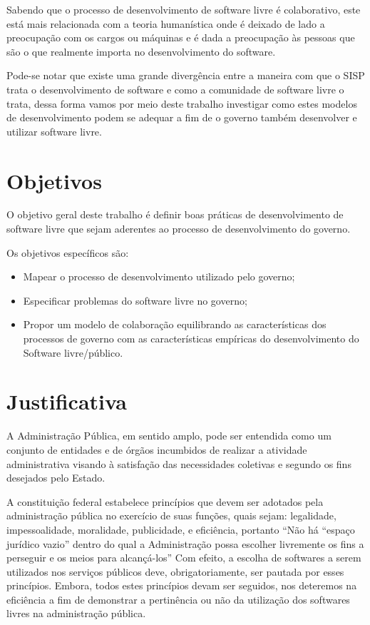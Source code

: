 Sabendo que o processo de desenvolvimento de software livre é colaborativo, este 
está mais relacionada com a teoria humanística onde é deixado de lado a preocupação
com os cargos ou máquinas e é dada a preocupação às pessoas que são o que realmente
importa no desenvolvimento do software.

Pode-se notar que existe uma grande divergência entre a maneira com que o SISP trata
o desenvolvimento de software e como a comunidade de software livre o trata, dessa forma vamos
por meio deste trabalho investigar como estes modelos de desenvolvimento podem 
se adequar a fim de o governo também desenvolver e utilizar software livre.

\section{Objetivos}

O objetivo geral deste trabalho é definir boas práticas de desenvolvimento de 
software livre que sejam aderentes ao processo de desenvolvimento do governo.

Os objetivos específicos são:

\begin{itemize}
\item Mapear o processo de desenvolvimento utilizado pelo governo;
\item Especificar problemas do software livre no governo;
\item Propor um modelo de colaboração equilibrando as características 
dos processos de governo com as características empíricas do desenvolvimento 
do Software livre/público.
\end{itemize}

\section{Justificativa}

A Administração Pública, em sentido amplo, pode ser entendida como um conjunto 
de entidades e de órgãos incumbidos de realizar a atividade administrativa visando 
à satisfação das necessidades coletivas e segundo os fins desejados pelo Estado.
\cite{coutinho2012uso}

A constituição federal estabelece princípios que devem ser adotados pela administração pública
no exercício de suas funções, quais sejam: legalidade, impessoalidade, moralidade, publicidade, e
eficiência, portanto “Não há “espaço jurídico vazio” dentro do qual a Administração possa escolher
livremente os fins a perseguir e os meios para alcançá-los” 
%
Com efeito, a escolha de softwares a serem utilizados nos serviços públicos deve, obrigatoriamente,
ser pautada por esses princípios. Embora, todos estes princípios devam ser seguidos, nos
deteremos na eficiência a fim de demonstrar a pertinência ou não da utilização dos softwares livres
na administração pública.\cite{coutinho2012uso}

